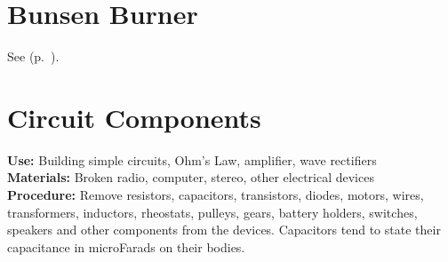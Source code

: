 \begin{multicols}{2}
\section{Bunsen Burner}
\label{sec:bunsen-burner}
See  (p.~\pageref{sec:heatsources}).


\section{Circuit Components}
\label{sec:circuit-comp}
\vspace{-10pt}
\textbf{Use:} Building simple circuits, Ohm's Law, amplifier, wave rectifiers\\
\textbf{Materials:} Broken radio, computer, stereo, other electrical devices\\
\textbf{Procedure:} Remove resistors, capacitors, transistors, diodes, motors, wires, transformers, inductors, rheostats, pulleys, gears, battery holders, switches, speakers and other components from the devices. Capacitors tend to state their capacitance in microFarads on their bodies.



\end{multicols}
